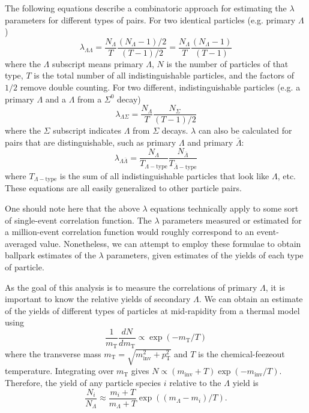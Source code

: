 The following equations describe a combinatoric approach for estimating the $\lambda$ parameters for different types of pairs.  For two identical particles (e.g. primary $\Lambda$) \begin{equation}
\label{eq:LambdaIdentical}
\lambda_{\Lambda\Lambda} = \frac{N_\Lambda}{T}\frac{(N_\Lambda -1)/2}{(T-1)/2} = \frac{N_\Lambda}{T}\frac{(N_\Lambda -1)}{(T-1)}
\end{equation}
where the $\Lambda$ subscript means primary $\Lambda$, $N$ is the number of particles of that type, $T$ is the total number of all indistinguishable particles, and the factors of $1/2$ remove double counting.  For two different, indistinguishable particles (e.g. a primary $\Lambda$ and a $\Lambda$ from a $\Sigma^0$ decay)
\begin{equation}
\lambda_{\Lambda\Sigma} = \frac{N_\Lambda}{T} \frac{N_\Sigma}{(T-1)/2}
\end{equation}
where the $\Sigma$ subscript indicates $\Lambda$ from $\Sigma$ decays.  $\lambda$ can also be calculated for pairs that are distinguishable, such as primary $\Lambda$ and primary $\bar{\Lambda}$:
\begin{equation}
\lambda_{\Lambda\bar{\Lambda}} = \frac{N_\Lambda}{T_{\Lambda-\mathrm{type}}} \frac{N_{\bar{\Lambda}}}{T_{\bar{\Lambda}-\mathrm{type}}}
\end{equation}
where $T_{\Lambda-\mathrm{type}}$ is the sum of all indistinguishable particles that look like $\Lambda$, etc.  These equations are all easily generalized to other particle pairs.

One should note here that the above $\lambda$ equations technically apply to some sort of single-event correlation function.  The $\lambda$ parameters measured or estimated for a million-event correlation function would roughly correspond to an event-averaged value.  Nonetheless, we can attempt to employ these formulae to obtain ballpark estimates of the $\lambda$ parameters, given estimates of the yields of each type of particle.

As the goal of this analysis is to measure the correlations of primary $\Lambda$, it is important to know the relative yields of secondary $\Lambda$.  We can obtain an estimate \cite{Florkowski:2010zz} of the yields of different types of particles at mid-rapidity from a thermal model using
\begin{equation}
\frac{1}{m_{\mathrm{T}}}\frac{dN}{dm_{\mathrm{T}}} \propto \exp{(-m_\mathrm{T}/T)}
\end{equation}
where the transverse mass $m_\mathrm{T} = \sqrt{m^2_{\mathrm{inv}} + p^2_{\mathrm{T}}}$ and $T$ is the chemical-feezeout temperature.  Integrating over $m_\mathrm{T}$ gives $N \propto (m_\mathrm{inv} + T) \exp{(-m_\mathrm{inv}/T)}$.  Therefore, the yield of any particle species $i$ relative to the $\Lambda$ yield is
\begin{equation}
\frac{N_i}{N_\Lambda} \approx \frac{m_i + T}{m_\Lambda + T} \exp{((m_\Lambda - m_i)/T)}.
\end{equation}

